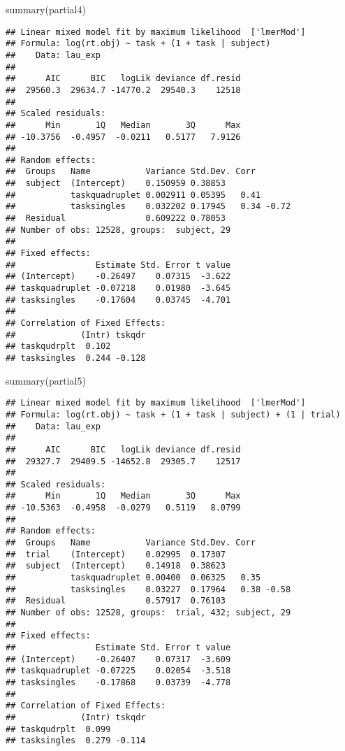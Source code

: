 \documentclass[
]{article}
\newenvironment{Shaded}{\begin{snugshade}}{\end{snugshade}}
\newcommand{\FunctionTok}[1]{\textcolor[rgb]{0.00,0.00,0.00}{#1}}
\newcommand{\NormalTok}[1]{#1}
\begin{document}
\begin{Shaded}
\begin{Highlighting}[]
\FunctionTok{summary}\NormalTok{(partial4)}
\end{Highlighting}
\end{Shaded}

\begin{verbatim}
## Linear mixed model fit by maximum likelihood  ['lmerMod']
## Formula: log(rt.obj) ~ task + (1 + task | subject)
##    Data: lau_exp
## 
##      AIC      BIC   logLik deviance df.resid 
##  29560.3  29634.7 -14770.2  29540.3    12518 
## 
## Scaled residuals: 
##      Min       1Q   Median       3Q      Max 
## -10.3756  -0.4957  -0.0211   0.5177   7.9126 
## 
## Random effects:
##  Groups   Name           Variance Std.Dev. Corr       
##  subject  (Intercept)    0.150959 0.38853             
##           taskquadruplet 0.002911 0.05395   0.41      
##           tasksingles    0.032202 0.17945   0.34 -0.72
##  Residual                0.609222 0.78053             
## Number of obs: 12528, groups:  subject, 29
## 
## Fixed effects:
##                Estimate Std. Error t value
## (Intercept)    -0.26497    0.07315  -3.622
## taskquadruplet -0.07218    0.01980  -3.645
## tasksingles    -0.17604    0.03745  -4.701
## 
## Correlation of Fixed Effects:
##             (Intr) tskqdr
## taskqudrplt  0.102       
## tasksingles  0.244 -0.128
\end{verbatim}

\begin{Shaded}
\begin{Highlighting}[]
\FunctionTok{summary}\NormalTok{(partial5)}
\end{Highlighting}
\end{Shaded}

\begin{verbatim}
## Linear mixed model fit by maximum likelihood  ['lmerMod']
## Formula: log(rt.obj) ~ task + (1 + task | subject) + (1 | trial)
##    Data: lau_exp
## 
##      AIC      BIC   logLik deviance df.resid 
##  29327.7  29409.5 -14652.8  29305.7    12517 
## 
## Scaled residuals: 
##      Min       1Q   Median       3Q      Max 
## -10.5363  -0.4958  -0.0279   0.5119   8.0799 
## 
## Random effects:
##  Groups   Name           Variance Std.Dev. Corr       
##  trial    (Intercept)    0.02995  0.17307             
##  subject  (Intercept)    0.14918  0.38623             
##           taskquadruplet 0.00400  0.06325   0.35      
##           tasksingles    0.03227  0.17964   0.38 -0.58
##  Residual                0.57917  0.76103             
## Number of obs: 12528, groups:  trial, 432; subject, 29
## 
## Fixed effects:
##                Estimate Std. Error t value
## (Intercept)    -0.26407    0.07317  -3.609
## taskquadruplet -0.07225    0.02054  -3.518
## tasksingles    -0.17868    0.03739  -4.778
## 
## Correlation of Fixed Effects:
##             (Intr) tskqdr
## taskqudrplt  0.099       
## tasksingles  0.279 -0.114
\end{verbatim}
\end{document}
